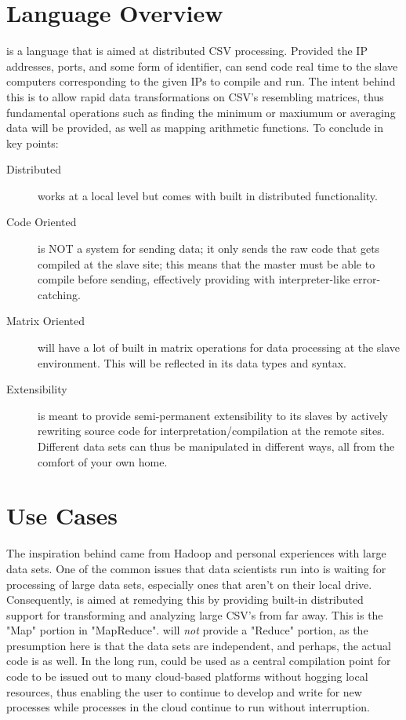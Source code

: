 \documentclass[10pt]{article}
\title{\name}
\author{PLT Group}
\begin{document}
\maketitle

\section{Language Overview}
    \name is a language that is aimed at distributed CSV processing. Provided the IP addresses, ports, and some form of identifier, \name can send code real time to the slave computers corresponding to the given IPs to compile and run. The intent behind this is to allow rapid data transformations on CSV's resembling matrices, thus fundamental operations such as finding the minimum or maxiumum or averaging data will be provided, as well as mapping arithmetic functions. To conclude in key points:
    \begin{description}
    \item[Distributed] \name works at a local level but comes with built in distributed functionality.
    \item[Code Oriented] \name is NOT a system for sending data; it only sends the raw code that gets compiled at the slave site; this means that the master must be able to compile before sending, effectively providing \name with interpreter-like error-catching.
    \item[Matrix Oriented] \name will have a lot of built in matrix operations for data processing at the slave environment. This will be reflected in its data types and syntax.
    \item[Extensibility] \name is meant to provide semi-permanent extensibility to its slaves by actively rewriting source code for interpretation/compilation at the remote sites. 
        Different data sets can thus be manipulated in different ways, all from the comfort of your own home.
    \end{description}
    
\section{Use Cases}
	The inspiration behind \name came from Hadoop and personal experiences with large data sets. One of the common issues that data scientists run into is waiting for processing of large data sets, especially ones that aren't on their local drive. Consequently, \name is aimed at remedying this by providing built-in distributed support for transforming and analyzing large CSV's from far away. This is the "Map" portion in "MapReduce". \name will \emph{not} provide a "Reduce" portion, as the presumption here is that the data sets are independent, and perhaps, the actual code is as well.
    In the long run, \name could be used as a central compilation point for code to be issued out to many cloud-based platforms without hogging local resources, thus enabling the user to continue to develop and write for new processes while processes in the cloud continue to run without interruption.
    
\end{document}

